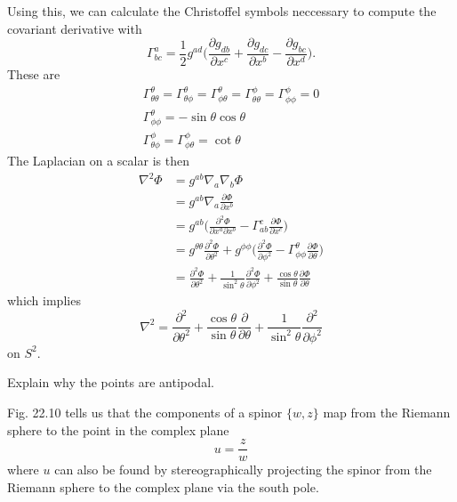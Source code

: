 \documentclass[../road-to-reality.tex]{subfiles}
\begin{document}
\begin{questions}
\begin{solution}
\[		\]
		Using this, we can calculate the Christoffel symbols neccessary to compute the covariant derivative with
		\[
			\Gamma^a_{bc} = \frac{1}{2}g^{ad}\Big(\frac{\partial g_{db}}{\partial x^c} + \frac{\partial g_{dc}}{\partial x^b} - \frac{\partial g_{bc}}{\partial x^d}\Big).
		\]
		These are
		\begin{gather*}
			\Gamma^{\theta}_{\theta\theta} = \Gamma^{\theta}_{\theta\phi} = \Gamma^{\theta}_{\phi\theta} = \Gamma^{\phi}_{\theta\theta} = \Gamma^{\phi}_{\phi\phi} = 0 \\
			\Gamma^{\theta}_{\phi\phi} = -\sin\theta\cos\theta \\
			\Gamma^{\phi}_{\theta\phi} = \Gamma^{\phi}_{\phi\theta} = \cot\theta
		\end{gather*}
		The Laplacian on a scalar is then
		\begin{align*}
			\nabla^2\Phi &= g^{ab}\nabla_a\nabla_b\Phi \\
			&= g^{ab}\nabla_a\frac{\partial\Phi}{\partial x^b} \\
			&= g^{ab}\Big(\frac{\partial^2\Phi}{\partial x^a\partial x^b} - \Gamma^{c}_{ab}\frac{\partial\Phi}{\partial x^c}\Big) \\
			&= g^{\theta\theta}\frac{\partial^2\Phi}{\partial\theta^2} + g^{\phi\phi}\Big(\frac{\partial^2\Phi}{\partial\phi^2} - \Gamma^{\theta}_{\phi\phi}\frac{\partial\Phi}{\partial\theta}\Big) \\
			&= \frac{\partial^2\Phi}{\partial\theta^2} + \frac{1}{\sin^2\theta}\frac{\partial^2\Phi}{\partial\phi^2} + \frac{\cos\theta}{\sin\theta}\frac{\partial\Phi}{\partial\theta}
		\end{align*}
		which implies
		\[
			\nabla^2 = \frac{\partial^2}{\partial\theta^2} + \frac{\cos\theta}{\sin\theta}\frac{\partial}{\partial\theta} + \frac{1}{\sin^2\theta}\frac{\partial^2}{\partial\phi^2}
		\]
		on $S^2$.
\end{solution}

\question Explain why the points are antipodal.

\begin{solution}
	Fig. 22.10 tells us that the components of a spinor $\{w, z\}$ map from the Riemann sphere to the point in the complex plane 
	\[
		u = \frac{z}{w}
	\]
	where $u$ can also be found by stereographically projecting the spinor from the Riemann sphere to the complex plane via the south pole.
	

\end{solution}
\end{questions}
\end{document}
